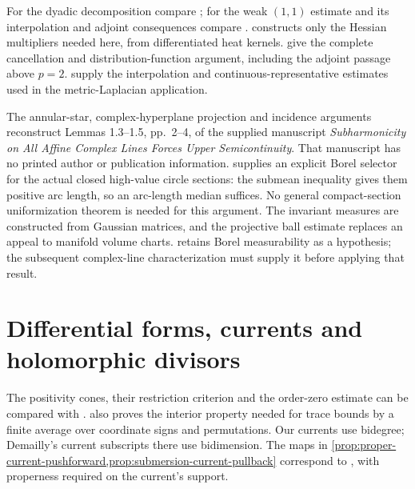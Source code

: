 For the dyadic decomposition compare \cite[Proposition 4.3 and proof, pp.~23--24]{Tao06Fourier3}; for the weak $(1,1)$ estimate and its interpolation and adjoint consequences compare \cite[Lemma 2.7, Corollaries 2.9--2.10 and proofs, pp.~7--9]{Tao06Fourier4}.  constructs only the Hessian multipliers needed here, from differentiated heat kernels.  give the complete cancellation and distribution-function argument, including the adjoint passage above $p=2$.  supply the interpolation and continuous-representative estimates used in the metric-Laplacian application.

The annular-star, complex-hyperplane projection and incidence arguments reconstruct Lemmas 1.3--1.5, pp.~2--4, of the supplied manuscript \emph{Subharmonicity on All Affine Complex Lines Forces Upper Semicontinuity}. That manuscript has no printed author or publication information.  supplies an explicit Borel selector for the actual closed high-value circle sections: the submean inequality gives them positive arc length, so an arc-length median suffices. No general compact-section uniformization theorem is needed for this argument. The invariant measures are constructed from Gaussian matrices, and the projective ball estimate replaces an appeal to manifold volume charts.  retains Borel measurability as a hypothesis; the subsequent complex-line characterization must supply it before applying that result.

\section{Differential forms, currents and holomorphic divisors}
\label{sec:history-complex-currents}
The positivity cones, their restriction criterion and the order-zero estimate can be compared with \cite[Chapter III, Section 1.A--B, pp.~129--134, especially (1.4), (1.6) and (1.14)]{DemBook}.  also proves the interior property needed for trace bounds by a finite average over coordinate signs and permutations. Our currents use bidegree; Demailly's current subscripts there use bidimension. The maps in \cref{prop:proper-current-pushforward,prop:submersion-current-pullback} correspond to \cite[Chapter III, (1.17), p.~134]{DemBook}, with properness required on the current's support.


